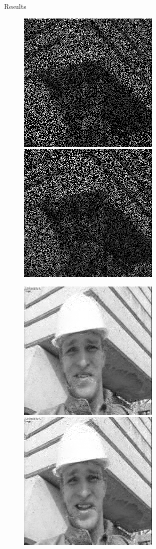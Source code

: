 \documentclass[final]{beamer}
\begin{document}
\begin{frame}{}
\begin{textblock}{19.5}
\begin{block}{Results}
\begin{figure}
\begin{minipage}{0.8\linewidth}
\centering
\includegraphics[width = 0.4\linewidth]{foreman_large_masked_42.png}
\includegraphics[width = 0.4\linewidth]{foreman_large_masked_43.png}
\end{minipage}
\begin{minipage}{0.8\linewidth}
\centering
\includegraphics[width = 0.4\linewidth]{foreman_large_rec_42.png}
\includegraphics[width = 0.4\linewidth]{foreman_large_rec_43.png}

\end{minipage}
\end{figure}
\end{block}
\end{textblock}
\end{frame}
\end{document}
